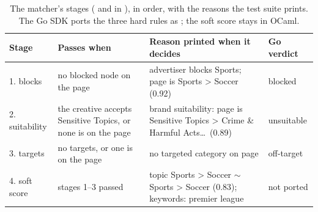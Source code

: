 \begin{table}[t]
\centering
\caption{The matcher's stages ( and 
  in ), in order, with the reasons the test suite
  prints. The Go SDK ports the three hard rules as ; the soft
  score stays in OCaml.}
\label{tab:serving-pipeline}
\small
\begin{tabularx}{\linewidth}{@{}l >{\raggedright\arraybackslash}p{4.1cm} >{\raggedright\arraybackslash}X l@{}}
\toprule
Stage & Passes when & Reason printed when it decides & Go verdict\\
\midrule
1. blocks & no blocked node on the page & advertiser blocks Sports; page is Sports > Soccer (0.92) & blocked\\
2. suitability & the creative accepts Sensitive Topics, or none is on the page & brand suitability: page is Sensitive Topics > Crime \& Harmful Acts\dots\ (0.89) & unsuitable\\
3. targets & no targets, or one is on the page & no targeted category on page & off-target\\
4. soft score & stages 1--3 passed & topic Sports > Soccer $\sim$ Sports > Soccer (0.83); keywords: premier league & not ported\\
\bottomrule
\end{tabularx}
\end{table}

